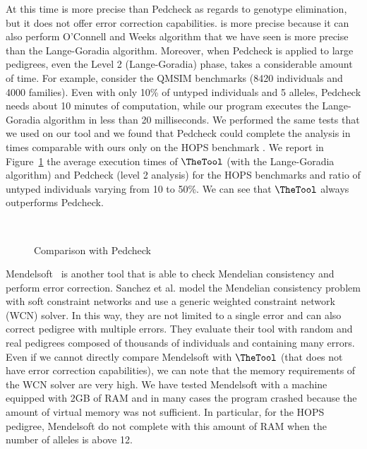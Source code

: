At this time {\TheTool} is more precise than Pedcheck as regards to
genotype elimination, but it does not offer error correction capabilities. 
{\TheTool} is more precise because it can also perform O'Connell and Weeks
algorithm that we have seen is more precise than the Lange-Goradia algorithm.
Moreover, when Pedcheck is applied to large pedigrees, even the Level 2
(Lange-Goradia) phase, takes a considerable amount of time. For example,
consider the QMSIM benchmarks (8420 individuals and 4000 families). Even with
only 10\% of untyped individuals and 5 alleles, Pedcheck needs about 10 minutes
of computation, while our program executes the Lange-Goradia algorithm in less
than 20 milliseconds. We performed the same tests that we used on our tool and
we found that Pedcheck could complete the analysis in times comparable with ours
only on the HOPS benchmark . We report in Figure~\ref{fig:pedcheckcfr} the
average execution times of {$\TheTool$} (with the Lange-Goradia algorithm) and
Pedcheck (level 2 analysis) for the HOPS benchmarks and ratio of untyped
individuals varying from 10 to 50\%. We can see that {$\TheTool$} always
outperforms Pedcheck.

\begin{figure}
  \centering
  \\
  \caption{Comparison with Pedcheck}
  \label{fig:pedcheckcfr}
\end{figure}


Mendelsoft~\cite{Sanchez2008} is another tool that is able to check Mendelian
consistency and perform error correction. Sanchez et al. model the Mendelian
consistency problem with soft constraint networks and use a generic weighted
constraint network (WCN) solver. In this way, they are not limited to a single error
and can also correct pedigree with multiple errors. They evaluate their tool
with random and real pedigrees composed of thousands of individuals and
containing many errors. Even if we cannot directly compare Mendelsoft with
{$\TheTool$} (that does not have error correction capabilities), we can note
that the memory requirements of the WCN solver are very high. We have tested
Mendelsoft with a machine equipped with 2GB of RAM and in many cases the program
crashed because the amount of virtual memory was not sufficient. In particular,
for the HOPS pedigree, Mendelsoft do not complete with this amount of RAM when
the number of alleles is above 12.

